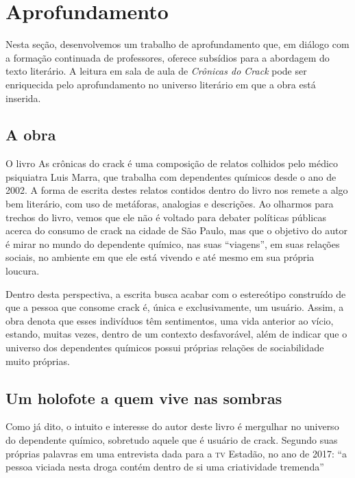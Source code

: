 \documentclass[12pt]{extarticle}
\begin{document}
\section{Aprofundamento}

Nesta seção, desenvolvemos um trabalho de aprofundamento que, em diálogo
com a formação continuada de professores, oferece subsídios para a
abordagem do texto literário. A leitura em sala de aula de
\emph{Crônicas do Crack} pode ser enriquecida pelo aprofundamento no
universo literário em que a obra está inserida.

\subsection{A obra}

O livro As crônicas do crack é uma composição de relatos colhidos
pelo médico psiquiatra Luis Marra, que trabalha com dependentes químicos
desde o ano de 2002. A forma de escrita destes relatos contidos dentro
do livro nos remete a algo bem literário, com uso de metáforas,
analogias e descrições. Ao olharmos para trechos do livro, vemos que ele
não é voltado para debater políticas públicas acerca do consumo de crack
na cidade de São Paulo, mas que o objetivo do autor é mirar no mundo do
dependente químico, nas suas ``viagens'', em suas relações sociais, no
ambiente em que ele está vivendo e até mesmo em sua própria loucura.

Dentro desta perspectiva, a escrita busca acabar com o estereótipo
construído de que a pessoa que consome crack é, única e exclusivamente,
um usuário. Assim, a obra denota que esses indivíduos têm sentimentos,
uma vida anterior ao vício, estando, muitas vezes, dentro de um contexto
desfavorável, além de indicar que o universo dos dependentes químicos
possui próprias relações de sociabilidade muito próprias.

\subsection{Um holofote a quem vive nas sombras}

Como já dito, o intuito e interesse do autor deste livro é mergulhar no
universo do dependente químico, sobretudo aquele que é usuário de crack.
Segundo suas próprias palavras em uma entrevista dada para a \textsc{tv} Estadão,
no ano de 2017: ``a pessoa viciada nesta droga contém dentro de si uma
criatividade tremenda''

\end{document}
